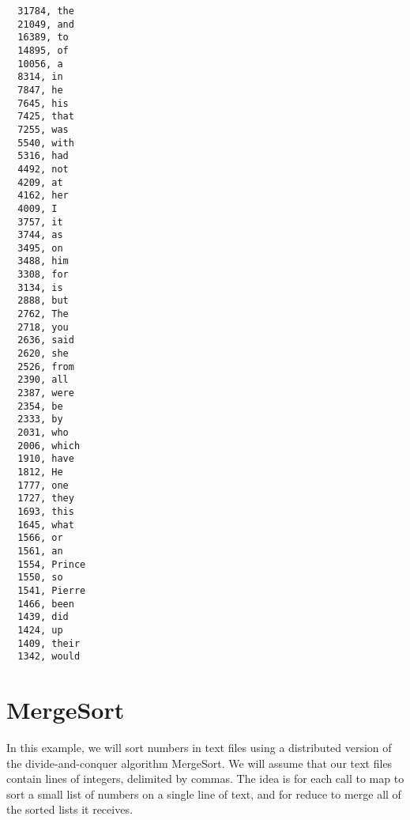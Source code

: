 \documentclass{article} \usepackage{fancyhdr, multicol}
\begin{document}
\begin{verbatim}
  31784, the
  21049, and
  16389, to
  14895, of
  10056, a
  8314, in
  7847, he
  7645, his
  7425, that
  7255, was
  5540, with
  5316, had
  4492, not
  4209, at
  4162, her
  4009, I
  3757, it
  3744, as
  3495, on
  3488, him
  3308, for
  3134, is
  2888, but
  2762, The
  2718, you
  2636, said
  2620, she
  2526, from
  2390, all
  2387, were
  2354, be
  2333, by
  2031, who
  2006, which
  1910, have
  1812, He
  1777, one
  1727, they
  1693, this
  1645, what
  1566, or
  1561, an
  1554, Prince
  1550, so
  1541, Pierre
  1466, been
  1439, did
  1424, up
  1409, their
  1342, would
\end{verbatim}

\section*{MergeSort} \label{merge_sort} 

In this example, we will sort numbers in text files using a distributed version of
the divide-and-conquer algorithm MergeSort. We will assume that our text files
contain lines of integers, delimited by commas. The idea is for each call to map to
sort a small list of numbers on a single line of text, and for reduce to merge all
of the sorted lists it receives.
\end{document}
